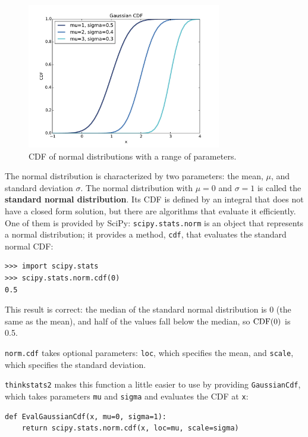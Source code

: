 \documentclass[12pt]{book}
\begin{document}
%
%

\begin{figure}
\centerline{\includegraphics[height=2.5in]{figs/analytic_gaussian_cdf.pdf}}
\caption{CDF of normal distributions with a range of parameters.}
\label{analytic_gaussian_cdf}
\end{figure}

The normal distribution is characterized by two parameters: the mean,
$\mu$, and standard deviation $\sigma$.  The normal distribution with
$\mu=0$ and $\sigma=1$ is called the {\bf standard normal
  distribution}.  Its CDF is defined by an integral that does not have
a closed form solution, but there are algorithms that evaluate it
efficiently.  One of them is provided by SciPy: {\tt scipy.stats.norm}
is an object that represents a normal distribution; it provides a
method, {\tt cdf}, that evaluates the standard normal CDF:

\begin{verbatim}
>>> import scipy.stats
>>> scipy.stats.norm.cdf(0)
0.5
\end{verbatim}

This result is correct: the median of the standard normal distribution
is 0 (the same as the mean), and half of the values fall below the
median, so $\mathrm{CDF}(0)$ is 0.5.

{\tt norm.cdf} takes optional parameters: {\tt loc}, which
specifies the mean, and {\tt scale}, which specifies the
standard deviation.

{\tt thinkstats2} makes this function a little easier to use
by providing {\tt GaussianCdf}, which takes parameters {\tt mu}
and {\tt sigma} and evaluates the CDF at {\tt x}:

\begin{verbatim}
def EvalGaussianCdf(x, mu=0, sigma=1):
    return scipy.stats.norm.cdf(x, loc=mu, scale=sigma)
\end{verbatim}
\end{document}
